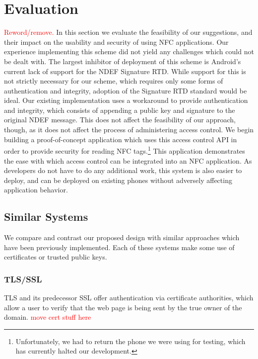 \documentclass[12pt]{article}
\newcommand\TODO[1]{\textcolor{red}{#1}}
\begin{document}
\section{Evaluation}
\TODO{Reword/remove.}
In this section we evaluate the feasibility of our suggestions, and their impact on the usability and security of using NFC applications.
Our experience implementing this scheme did not yield any challenges which could not be dealt with.
The largest inhibitor of deployment of this scheme is Android's current lack of support for the NDEF Signature RTD.
While support for this is not strictly necessary for our scheme, which requires only some forms of authentication and integrity, adoption of the Signature RTD standard would be ideal.
Our existing implementation uses a workaround to provide authentication and integrity, which consists of appending a public key and signature to the original NDEF message.
This does not affect the feasibility of our approach, though, as it does not affect the process of administering access control.
We begin building a proof-of-concept application which uses this access control API in order to provide security for reading NFC tags.\footnote{Unfortunately, we had to return the phone we were using for testing, which has currently halted our development.}
This application demonstrates the ease with which access control can be integrated into an NFC application.
As developers do not have to do any additional work, this system is also easier to deploy, and can be deployed on existing phones without adversely affecting application behavior.

\subsection{Similar Systems}
We compare and contrast our proposed design with similar approaches which have been previously implemented.
Each of these systems make some use of certificates or trusted public keys.

\subsubsection{TLS/SSL}
TLS and its predecessor SSL offer authentication via certificate authorities, which allow a user to verify that the web page is being sent by the true owner of the domain.
\TODO{move cert stuff here}
\end{document}
